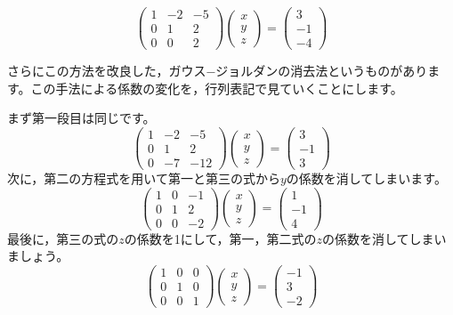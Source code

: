 \documentclass{ltjsbook}
\begin{document}
\[
\begin{pmatrix} 1 & -2 & -5 \\
				0 &  1 &  2 \\
				0 &  0 &  2 \end{pmatrix}
\begin{pmatrix} x \\ y \\ z \end{pmatrix}
=
\begin{pmatrix} 3 \\ -1 \\ -4 \end{pmatrix}
\]

さらにこの方法を改良した，ガウス−ジョルダンの消去法というものがあります。この手法による係数の変化を，行列表記で見ていくことにします。

まず第一段目は同じです。
\[
\begin{pmatrix} 1 & -2 & -5 \\
				0 &  1 &  2 \\
				0 & -7 & -12 \end{pmatrix}
\begin{pmatrix} x \\ y \\ z \end{pmatrix}
=
\begin{pmatrix} 3 \\ -1 \\ 3 \end{pmatrix}
\]
次に，第二の方程式を用いて第一と第三の式から$y$の係数を消してしまいます。
\[
\begin{pmatrix} 1 & 0 & -1 \\
				0 & 1 &  2 \\
				0 & 0 & -2 \end{pmatrix}
\begin{pmatrix} x \\ y \\ z \end{pmatrix}
=
\begin{pmatrix} 1 \\ -1 \\ 4 \end{pmatrix}
\]
最後に，第三の式の$z$の係数を1にして，第一，第二式の$z$の係数を消してしまいましょう。
\[
\begin{pmatrix} 1 & 0 & 0 \\
				0 & 1 & 0 \\
				0 & 0 & 1 \end{pmatrix}
\begin{pmatrix} x \\ y \\ z \end{pmatrix}
=
\begin{pmatrix} -1 \\ 3 \\ -2 \end{pmatrix}
\]
\end{document}
